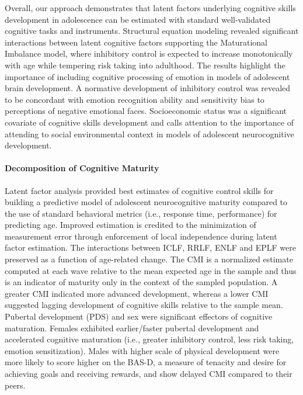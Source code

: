 \documentclass{article}%
\begin{document}
Overall, our approach demonstrates that latent factors underlying cognitive skills development in adolescence can be estimated with standard well-validated cognitive tasks and instruments. Structural equation modeling revealed significant interactions between latent cognitive factors supporting the Maturational Imbalance model, where inhibitory control is expected to increase monotonically with age while tempering risk taking into adulthood. The results highlight the importance of including cognitive processing of emotion in models of adolescent brain development. A normative development of inhibitory control was revealed to be concordant with emotion recognition ability and sensitivity bias to perceptions of negative emotional faces. Socioeconomic status was a significant covariate of cognitive skills development and calls attention to the importance of attending to social environmental context in models of adolescent neurocognitive development.
\vspace{2pt}
\paragraph*{Decomposition of Cognitive Maturity}
Latent factor analysis provided best estimates of cognitive control skills for building a predictive model of adolescent neurocognitive maturity compared to the use of standard behavioral metrics (i.e., response time, performance) for predicting age. Improved estimation is credited to the minimization of measurement error through enforcement of local independence during latent factor estimation. The interactions between ICLF, RRLF, ENLF and EPLF were preserved as a function of age-related change. The CMI is a normalized estimate computed at each wave relative to the mean expected age in the sample and thus is an indicator of maturity only in the context of the sampled population. A greater CMI indicated more advanced development, whereas a lower CMI suggested lagging development of cognitive skills relative to the sample mean. Pubertal development (PDS) and sex were significant effectors of cognitive maturation. Females exhibited earlier/faster pubertal development and accelerated cognitive maturation (i.e., greater inhibitory control, less risk taking, emotion sensitization). Males with higher scale of physical development were more likely to score higher on the BAS-D, a measure of tenacity and desire for achieving goals and receiving rewards, and show delayed CMI compared to their peers. 
\vspace{2pt}
\end{document}
